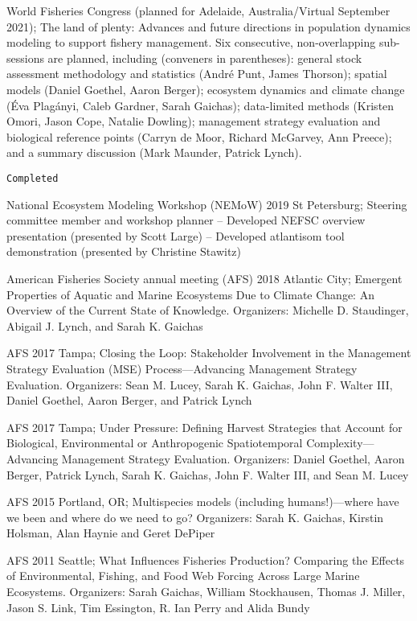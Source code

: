 \documentclass[11pt, a4paper]{awesome-cv}
\begin{document}
World Fisheries Congress (planned for Adelaide, Australia/Virtual
September 2021); The land of plenty: Advances and future directions in
population dynamics modeling to support fishery management. Six
consecutive, non-overlapping sub-sessions are planned, including
(conveners in parentheses): general stock assessment methodology and
statistics (André Punt, James Thorson); spatial models (Daniel Goethel,
Aaron Berger); ecosystem dynamics and climate change (Éva Plagányi,
Caleb Gardner, Sarah Gaichas); data-limited methods (Kristen Omori,
Jason Cope, Natalie Dowling); management strategy evaluation and
biological reference points (Carryn de Moor, Richard McGarvey, Ann
Preece); and a summary discussion (Mark Maunder, Patrick Lynch).

\begin{verbatim}
Completed
\end{verbatim}

National Ecosystem Modeling Workshop (NEMoW) 2019 St Petersburg;
Steering committee member and workshop planner -- Developed NEFSC
overview presentation (presented by Scott Large) -- Developed atlantisom
tool demonstration (presented by Christine Stawitz)

American Fisheries Society annual meeting (AFS) 2018 Atlantic City;
Emergent Properties of Aquatic and Marine Ecosystems Due to Climate
Change: An Overview of the Current State of Knowledge. Organizers:
Michelle D. Staudinger, Abigail J. Lynch, and Sarah K. Gaichas

AFS 2017 Tampa; Closing the Loop: Stakeholder Involvement in the
Management Strategy Evaluation (MSE) Process---Advancing Management
Strategy Evaluation. Organizers: Sean M. Lucey, Sarah K. Gaichas, John
F. Walter III, Daniel Goethel, Aaron Berger, and Patrick Lynch

AFS 2017 Tampa; Under Pressure: Defining Harvest Strategies that Account
for Biological, Environmental or Anthropogenic Spatiotemporal
Complexity---Advancing Management Strategy Evaluation. Organizers:
Daniel Goethel, Aaron Berger, Patrick Lynch, Sarah K. Gaichas, John F.
Walter III, and Sean M. Lucey

AFS 2015 Portland, OR; Multispecies models (including humans!)---where
have we been and where do we need to go? Organizers: Sarah K. Gaichas,
Kirstin Holsman, Alan Haynie and Geret DePiper

AFS 2011 Seattle; What Influences Fisheries Production? Comparing the
Effects of Environmental, Fishing, and Food Web Forcing Across Large
Marine Ecosystems. Organizers: Sarah Gaichas, William Stockhausen,
Thomas J. Miller, Jason S. Link, Tim Essington, R. Ian Perry and Alida
Bundy
\end{document}
